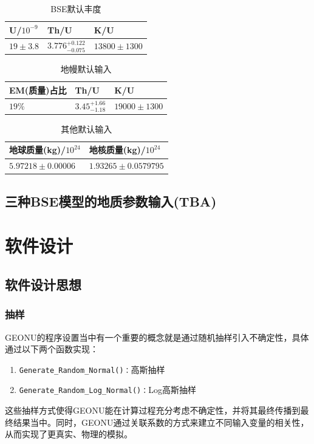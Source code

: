 				\begin{table}[H]
					\centering
					\caption{BSE默认丰度}
					\begin{tabular}{p{3cm}p{3cm}p{3cm}}
						\hline
						\hline
						U/$10^{-9}$ & Th/U & K/U\\
						\hline
						$19 \pm 3.8$ & $3.776^{+0.122}_{-0.075}$ & $13800 \pm 1300$\\
						\hline
						\hline
					\end{tabular}
					\label{Table: BSE Default Abundance Input}
				\end{table}
				\begin{table}[H]
					\centering
					\caption{地幔默认输入}
					\begin{tabular}{p{3cm}p{3cm}p{3cm}}
						\hline
						\hline
						EM(质量)占比 & Th/U & K/U \\
						\hline
						$19\%$ & $3.45^{+1.66}_{-1.18}$ & $19000 \pm 1300$\\
						\hline
						\hline
					\end{tabular}
				\end{table}
				\begin{table}[H]
					\centering
					\caption{其他默认输入}
					\begin{tabular}{p{4cm}|p{4cm}}
						\hline
						\hline
						地球质量(kg)/$10^{24}$ & 地核质量(kg)/$10^{24}$\\
						\hline
						$5.97218 \pm 0.00006 $ & $ 1.93265 \pm 0.0579795$\\
						\hline
						\hline
					\end{tabular}
					\label{Table: Other Default Geology Input}
				\end{table}
		\section{三种BSE模型的地质参数输入(TBA)}
	\chapter{软件设计}
		\section{软件设计思想}
			\subsection{抽样}
				GEONU的程序设置当中有一个重要的概念就是通过随机抽样引入不确定性，具体通过以下两个函数实现：
					\begin{enumerate}
						\item \texttt{Generate\_Random\_Normal()：}高斯抽样
						\item \texttt{Generate\_Random\_Log\_Normal()：}Log高斯抽样
					\end{enumerate}
				这些抽样方式使得GEONU能在计算过程充分考虑不确定性，并将其最终传播到最终结果当中。同时，GEONU通过关联系数的方式来建立不同输入变量的相关性，从而实现了更真实、物理的模拟。
